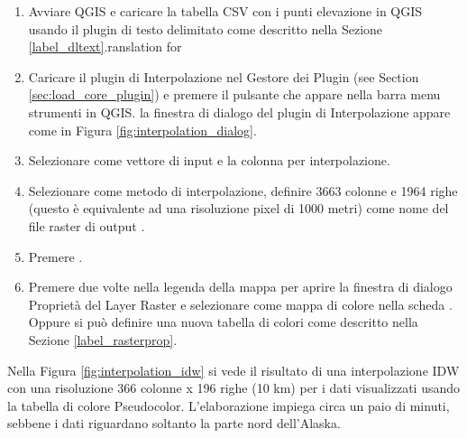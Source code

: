 \begin{enumerate}
  \item Avviare QGIS e caricare la  tabella CSV con i punti elevazione in QGIS usando il plugin di testo delimitato come descritto nella Sezione \ref{label_dltext}.ranslation for 
  \item Caricare il plugin di Interpolazione nel Gestore dei Plugin (see Section 
  \ref{sec:load_core_plugin}) e premere il pulsante  che appare nella barra menu strumenti in QGIS. la finestra di dialogo del plugin di Interpolazione appare come in Figura \ref{fig:interpolation_dialog}.
  \item Selezionare  come vettore di input e la colonna  per interpolazione.
  \item Selezionare  come metodo di interpolazione, definire 
  3663 colonne e 1964 righe (questo è equivalente ad una risoluzione pixel di 1000 metri) come nome del file raster di output .
  \item Premere .
  \item Premere due volte  nella legenda della mappa per aprire la finestra di dialogo Proprietà del Layer Raster e selezionare  come mappa di colore nella scheda . Oppure 
  si può definire una nuova tabella di colori come descritto nella Sezione \ref{label_rasterprop}.
\end{enumerate}

Nella Figura \ref{fig:interpolation_idw} si vede il risultato di una interpolazione IDW con una risoluzione 366 colonne x 196 righe (10 km) per i dati  visualizzati usando la tabella di colore Pseudocolor. L'elaborazione impiega circa un paio di minuti, sebbene i dati riguardano soltanto la parte nord dell'Alaska.


\newpage



